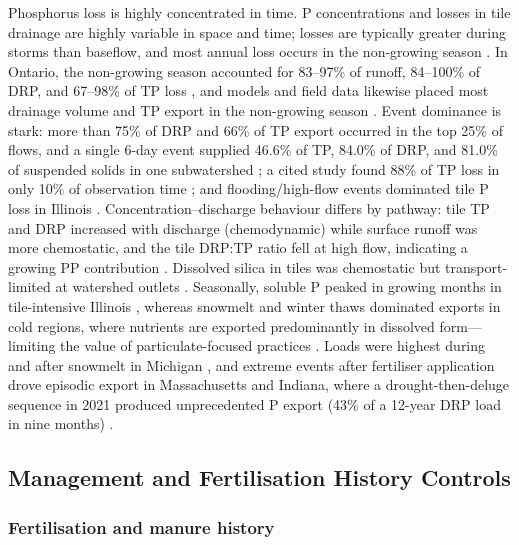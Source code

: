 \documentclass[11pt]{article}
\begin{document}
Phosphorus loss is highly concentrated in time. P concentrations and losses in tile drainage
are highly variable in space and time; losses are typically greater during storms than
baseflow, and most annual loss occurs in the non-growing season
\parencite{King2015}. In Ontario, the non-growing season accounted for 83--97\% of runoff,
84--100\% of DRP, and 67--98\% of TP loss \parencite{VanEsbroeck2016}, and models and field
data likewise placed most drainage volume and TP export in the non-growing season
\parencite{Qi2018,Sadhukhan2019b}. Event dominance is stark: more than 75\% of DRP and 66\% of
TP export occurred in the top 25\% of flows, and a single 6-day event supplied 46.6\% of TP,
84.0\% of DRP, and 81.0\% of suspended solids in one subwatershed \parencite{Brendel2019}; a
cited study found 88\% of TP loss in only 10\% of observation time \parencite{Elsayed2023};
and flooding/high-flow events dominated tile P loss in Illinois \parencite{Li2020b}.
Concentration--discharge behaviour differs by pathway: tile TP and DRP increased with
discharge (chemodynamic) while surface runoff was more chemostatic, and the tile DRP:TP ratio
fell at high flow, indicating a growing PP contribution \parencite{Osterholz2020}. Dissolved
silica in tiles was chemostatic but transport-limited at watershed outlets
\parencite{Sethna2022}. Seasonally, soluble P peaked in growing months in tile-intensive
Illinois \parencite{Algoazany2007}, whereas snowmelt and winter thaws dominated exports in
cold regions, where nutrients are exported predominantly in dissolved form---limiting the
value of particulate-focused practices \parencite{Baulch2019,VanEsbroeck2016}. Loads were
highest during and after snowmelt in Michigan \parencite{Clement2017}, and extreme events
after fertiliser application drove episodic export in Massachusetts and Indiana, where a
drought-then-deluge sequence in 2021 produced unprecedented P export (43\% of a 12-year DRP
load in nine months) \parencite{Millar2025,Mumbi2025b}.

\subsection{Management and Fertilisation History Controls}

\subsubsection{Fertilisation and manure history}
\end{document}

